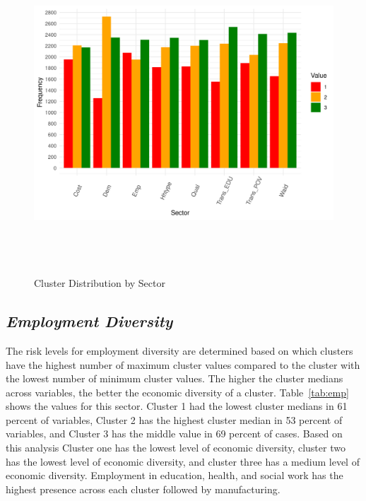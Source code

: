 \begin{figure}[htbp]
    \centering
     \includegraphics[width=1\textwidth, height=12cm]{plots/cluster_distribution.png}
     \caption{Cluster Distribution by Sector}
     \label{fig:cluster_dis}
 \end{figure}

\subsection{\textit{Employment Diversity}}
The risk levels for employment diversity are determined based on which clusters have the highest number of maximum cluster values compared to the cluster with the lowest number of minimum cluster values. The higher the cluster medians across variables, the better the economic diversity of a cluster. Table~\ref{tab:emp} shows the values for this sector. 
Cluster 1 had the lowest cluster medians in 61 percent of variables, 
Cluster 2 has the highest cluster median in 53 percent of variables, and Cluster 3 has the middle value in 69 %
percent of cases. Based on this analysis Cluster one has the lowest level of economic diversity, cluster two has the lowest level of economic diversity, and cluster three has a medium level of economic diversity. Employment in education, health, and social work has the highest presence across each cluster followed by manufacturing. 




